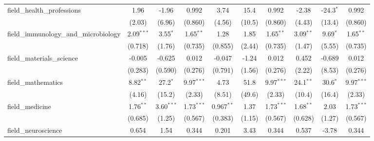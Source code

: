 \begin{tabular}{lccccccccc}
   field\_health\_professions                                  & 1.96           & -1.96         & 0.992          & 3.74           & 15.4         & 0.992          & -2.38         & -24.3$^{*}$   & 0.992\\   
                                                               & (2.03)         & (6.96)        & (0.860)        & (4.56)         & (10.5)       & (0.860)        & (4.43)        & (13.4)        & (0.860)\\   
   field\_immunology\_and\_microbiology                        & 2.09$^{***}$   & 3.55$^{*}$    & 1.65$^{**}$    & 1.28           & 1.85         & 1.65$^{**}$    & 3.09$^{**}$   & 9.69$^{*}$    & 1.65$^{**}$\\   
                                                               & (0.718)        & (1.76)        & (0.735)        & (0.855)        & (2.44)       & (0.735)        & (1.47)        & (5.55)        & (0.735)\\   
   field\_materials\_science                                   & -0.005         & -0.625        & 0.012          & -0.047         & -1.24        & 0.012          & 0.452         & -0.689        & 0.012\\   
                                                               & (0.283)        & (0.590)       & (0.276)        & (0.791)        & (1.56)       & (0.276)        & (2.22)        & (8.53)        & (0.276)\\   
   field\_mathematics                                          & 8.82$^{**}$    & 27.2$^{*}$    & 9.97$^{***}$   & 4.73           & 51.8         & 9.97$^{***}$   & 24.1$^{**}$   & 30.6$^{*}$    & 9.97$^{***}$\\   
                                                               & (4.16)         & (15.2)        & (2.33)         & (8.51)         & (49.6)       & (2.33)         & (10.4)        & (16.4)        & (2.33)\\   
   field\_medicine                                             & 1.76$^{**}$    & 3.60$^{***}$  & 1.73$^{***}$   & 0.967$^{**}$   & 1.37         & 1.73$^{***}$   & 1.68$^{**}$   & 2.03          & 1.73$^{***}$\\   
                                                               & (0.685)        & (1.25)        & (0.567)        & (0.383)        & (1.15)       & (0.567)        & (0.628)       & (1.27)        & (0.567)\\   
   field\_neuroscience                                         & 0.654          & 1.54          & 0.344          & 0.201          & 3.43         & 0.344          & 0.537         & -3.78         & 0.344\\   

\end{tabular}
